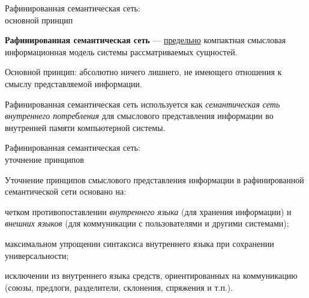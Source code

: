 \begin{frame}{Рафинированная семантическая сеть:\\основной принцип}
	\topline
	\justifying
	
	\textbf{Рафинированная семантическая сеть} ---
	\uline{предельно} компактная смысловая информационная модель системы рассматриваемых сущностей.
	
	\medskip
	Основной принцип: абсолютно ничего лишнего, не имеющего отношения к смыслу представляемой информации.
	
	\medskip
	Рафинированная семантическая сеть используется как \textit{семантическая сеть внутреннего потребления} для смыслового представления информации во внутренней памяти компьютерной системы.
	
\end{frame}


\begin{frame}{Рафинированная семантическая сеть:\\уточнение принципов}
	\topline
	\justifying
	
	Уточнение принципов смыслового представления информации в рафинированной семантической сети основано на:
	\begin{textitemize}
		\item четком противопоставлении \textit{внутреннего языка} (для хранения информации) и \textit{внешних языков} (для коммуникации с пользователями и другими системами);
		\item максимальном упрощении синтаксиса внутреннего языка при сохранении универсальности;
		\item исключении из внутреннего языка средств, ориентированных на коммуникацию (союзы, предлоги, разделители, склонения, спряжения и т.п.).
	\end{textitemize}
	
\end{frame}


